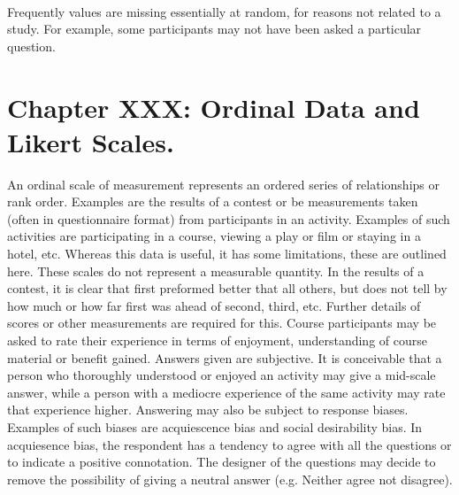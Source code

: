 \documentclass[12pt,twoside]{article}
\begin{document}
~ 

Frequently values are missing essentially at random, for reasons not
related to a study. For example, some participants may not have been
asked a particular question.


\bigskip

\section[Chapter XXX: Ordinal Data and Likert Scales. ]{\rmfamily
Chapter XXX: Ordinal Data and Likert Scales. }
\newline
An ordinal scale of measurement represents an ordered series of
relationships or rank order. Examples are the results of a contest or
be measurements taken (often in questionnaire format) from participants
in an activity. Examples of such activities are participating in a
course, viewing a play or film or staying in a hotel, etc.\newline
\newline
Whereas this data is useful, it has some limitations, these are outlined
here.\newline
\newline
These scales do not represent a measurable quantity. In the results of a
contest, it is clear that first preformed better that all others, but
does not tell by how much or how far first was ahead of second, third,
etc. Further details of scores or other measurements are required for
this.\newline
\newline
Course participants may be asked to rate their experience in terms of
enjoyment, understanding of course material or benefit gained.\newline
\newline
Answers given are subjective. It is conceivable that a person who
thoroughly understood or enjoyed an activity may give a mid{}-scale
answer, while a person with a mediocre experience of the same activity
may rate that experience higher.\newline
\newline
Answering may also be subject to response biases. Examples of such
biases are acquiescence bias and social desirability bias. In
acquiesence bias, the respondent has a tendency to agree with all the
questions or to indicate a positive connotation. The designer of the
questions may decide to remove the possibility of giving a neutral
answer (e.g. Neither agree not disagree).\newline
\end{document}
